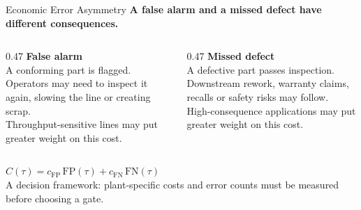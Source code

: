 \documentclass[aspectratio=169,10pt]{beamer}
\begin{document}
\begin{frame}{Economic Error Asymmetry}
  \textbf{A false alarm and a missed defect have different consequences.}\\[10pt]
  \begin{columns}[T,onlytextwidth]
    \begin{column}{0.47\textwidth}
      {\color{accent}\textbf{False alarm}}\\[4pt]
      A conforming part is flagged. Operators may need to inspect it again,
      slowing the line or creating scrap.\\[5pt]
      {\small\color{muted}Throughput-sensitive lines may put greater weight on this cost.}
    \end{column}
    \begin{column}{0.47\textwidth}
      {\color{teal}\textbf{Missed defect}}\\[4pt]
      A defective part passes inspection. Downstream rework, warranty claims,
      recalls or safety risks may follow.\\[5pt]
      {\small\color{muted}High-consequence applications may put greater weight on this cost.}
    \end{column}
  \end{columns}
  \vspace{16pt}
  \begin{center}
    $C(\tau)=c_{\mathrm{FP}}\,\mathrm{FP}(\tau)+c_{\mathrm{FN}}\,\mathrm{FN}(\tau)$\\[6pt]
    {\small\color{muted}A decision framework: plant-specific costs and error counts must be measured before choosing a gate.}
  \end{center}
\end{frame}
\end{document}
